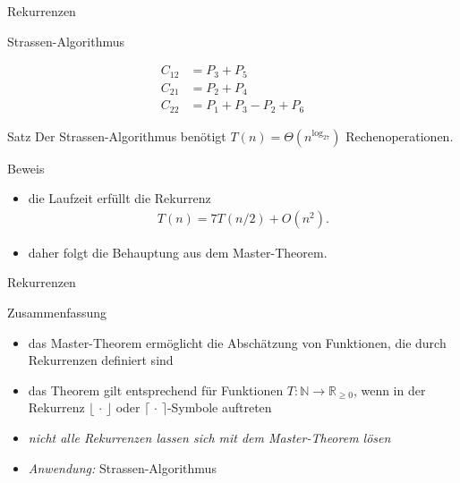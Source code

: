 \documentclass[aspectratio=1610, 11pt]{beamer}
\newcommand\NN{\mathbb N}
\newcommand\RRpos{\mathbb R_{\geq0}}
\begin{document}
\begin{frame}{Rekurrenzen}
\begin{overprint}
\begin{exampleblock}{Strassen-Algorithmus}
\begin{itemize}
\begin{align*}
						C_{12}&=P_3+P_5\\
						C_{21}&=P_2+P_4\\
						C_{22}&=P_1+P_3-P_2+P_6
					\end{align*}
			\end{itemize}
		\end{exampleblock}
		\begin{exampleblock}{Satz}
			Der Strassen-Algorithmus ben\"otigt $T(n)=\Theta(n^{\log_27})$ Rechenoperationen.
		\end{exampleblock}
		\begin{exampleblock}{Beweis}
			\begin{itemize}
				\item die Laufzeit erf\"ullt die Rekurrenz
					\begin{align*}
						T(n)=7T(n/2)+O(n^2).
					\end{align*}
				\item daher folgt die Behauptung aus dem Master-Theorem.
			\end{itemize}
		\end{exampleblock}
	\end{overprint}
\end{frame}

\begin{frame}{Rekurrenzen}
	\begin{exampleblock}{Zusammenfassung}
		\begin{itemize}
			\item das Master-Theorem erm\"oglicht die Absch\"atzung von Funktionen, die durch Rekurrenzen definiert sind
			\item das Theorem gilt entsprechend f\"ur Funktionen $T:\NN\to\RRpos$, wenn in der Rekurrenz $\lfloor\,\cdot\,\rfloor$ oder $\lceil\,\cdot\,\rceil$-Symbole auftreten
			\item {\itshape nicht alle Rekurrenzen lassen sich mit dem Master-Theorem l\"osen}
			\item \emph{Anwendung:} Strassen-Algorithmus
		\end{itemize}
	\end{exampleblock}
\end{frame}

 
\end{document}

